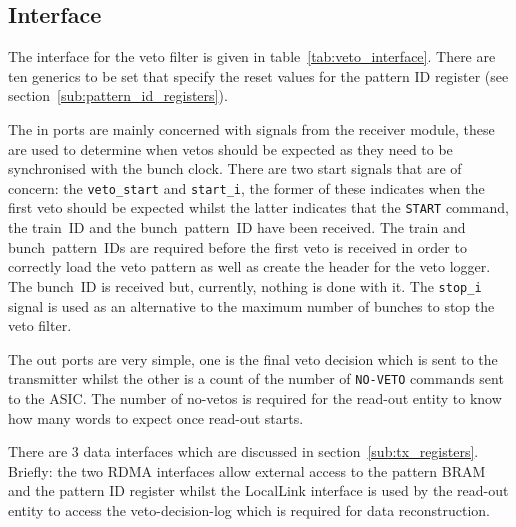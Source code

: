 \subsection{Interface} %
\label{sub:veto_interface}
The interface for the veto filter is given in table~\ref{tab:veto_interface}. There are ten generics to be set that specify the reset values for the pattern ID register (see section~\ref{sub:pattern_id_registers}).
    
The in ports are mainly concerned with signals from the receiver module, these are used to determine when vetos should be expected as they need to be synchronised with the bunch clock. There are two start signals that are of concern: the \texttt{veto\_start} and \texttt{start\_i}, the former of these indicates when the first veto should be expected whilst the latter indicates that the \texttt{START} command, the train~ID and the bunch~pattern~ID have been received. The train and bunch~pattern~IDs are required before the first veto is received in order to correctly load the veto pattern as well as create the header for the veto logger. The bunch~ID is received but, currently, nothing is done with it. The \texttt{stop\_i} signal is used as an alternative to the maximum number of bunches to stop the veto filter.
    
The out ports are very simple, one is the final veto decision which is sent to the transmitter whilst the other is a count of the number of \texttt{NO-VETO} commands sent to the ASIC. The number of no-vetos is required for the read-out entity to know how many words to expect once read-out starts.
    
There are 3 data interfaces which are discussed in section~\ref{sub:tx_registers}. Briefly: the two RDMA interfaces allow external access to the pattern BRAM and the pattern ID register whilst the LocalLink interface is used by the read-out entity to access the veto-decision-log which is required for data reconstruction.
    
